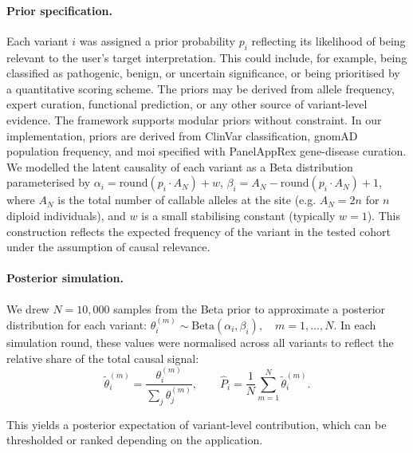 \paragraph{Prior specification.}
Each variant \( i \) was assigned a prior probability \( p_i \) reflecting its likelihood of being relevant to the user's target interpretation. This could include, for example, being classified as pathogenic, benign, or uncertain significance, or being prioritised by a quantitative scoring scheme. The priors may be derived from allele frequency, expert curation, functional prediction, or any other source of variant-level evidence. The framework supports modular priors without constraint. %
In our implementation, priors are derived from ClinVar classification, gnomAD population frequency, and \ac{moi} specified with PanelAppRex gene-disease curation. We modelled the latent causality of each variant as a Beta distribution parameterised by
$\alpha_i = \text{round}(p_i \cdot A_N) + w$, 
$\beta_i = A_N - \text{round}(p_i \cdot A_N) + 1$,
where \( A_N \) is the total number of callable alleles at the site (e.g. \( A_N = 2n \) for \( n \) diploid individuals), and \( w \) is a small stabilising constant (typically \( w = 1 \)). This construction reflects the expected frequency of the variant in the tested cohort under the assumption of causal relevance.

\paragraph{Posterior simulation.}
We drew \( N = 10{,}000 \) samples from the Beta prior to approximate a posterior distribution for each variant:
$\theta_i^{(m)} \sim \text{Beta}(\alpha_i, \beta_i), \quad m = 1,\dots,N$.
In each simulation round, these values were normalised across all variants to reflect the relative share of the total causal signal:
$$
\tilde{\theta}_i^{(m)} = \frac{\theta_i^{(m)}}{\sum_j \theta_j^{(m)}}, \qquad \hat{P}_i = \frac{1}{N} \sum_{m=1}^{N} \tilde{\theta}_i^{(m)}.
$$

This yields a posterior expectation of variant-level contribution, which can be thresholded or ranked depending on the application.

